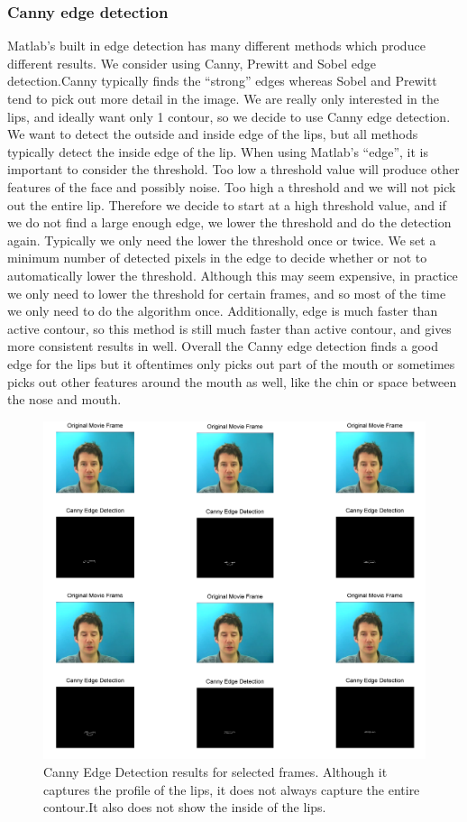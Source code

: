 \documentclass[a4paper]{article}
\begin{document}
\subsubsection{Canny edge detection}
Matlab's built in edge detection has many different methods which produce different results. We consider using Canny, Prewitt and Sobel edge detection.Canny typically finds the ``strong'' edges whereas Sobel and Prewitt tend to pick out more detail in the image. We are really only interested in the lips, and ideally want only 1 contour, so we decide to use Canny edge detection. We want to detect the outside and inside edge of the lips, but all methods typically detect  the inside edge of the lip. When using Matlab's ``edge'', it is important to consider the threshold. Too low a threshold value will produce other features of the face and possibly noise. Too high a threshold and we will not pick out the entire lip. Therefore we decide to start at a high threshold value, and if we do not find a large enough edge, we lower the threshold and do the detection again. Typically we only need the lower the threshold once or twice. We set a minimum number of detected pixels in the edge to decide whether or not to automatically lower the threshold. Although this may seem expensive, in practice we only need to lower the threshold for certain frames, and so most of the time we only need to do the algorithm once.  Additionally, edge is much faster than active contour, so this method is still much faster than active contour, and gives more consistent results in well. Overall the Canny edge detection finds a good edge for the lips but it oftentimes only picks out part of the mouth or sometimes picks out other features around the mouth as well, like the chin or space between the nose and mouth.\par
\begin{figure}[!ht]
	\includegraphics[width=1\textwidth, height=0.75\textwidth]{canny1.png}
	\caption{Canny Edge Detection results for selected frames. Although it captures the profile of the lips, it does not always capture the entire contour.It also does not show the inside of the lips.}
\end{figure} 
\end{document}
